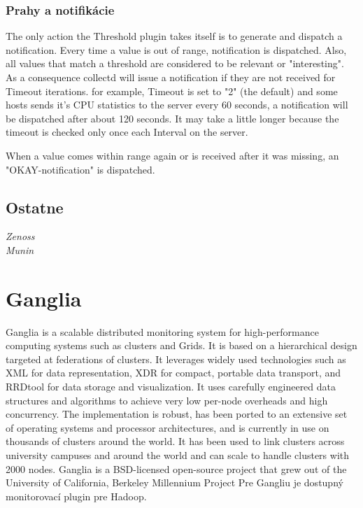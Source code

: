 \documentclass[11pt,final,oneside]{fithesis}
\begin{document}
\subsubsection{Prahy a notifikácie}

The only action the Threshold plugin takes itself is to generate and dispatch a notification. Every time a value is out of range, 
notification is dispatched. 
Also, all values that match a threshold are considered to be relevant or "interesting". As a consequence collectd will issue a notification 
if they are not received for Timeout iterations.  for example, Timeout is set to "2" (the default) and some hosts sends it's CPU statistics to the server every 60 seconds, a notification will be dispatched after about 120 seconds. It may take a little longer because the timeout is checked only once each Interval on the server.

When a value comes within range again or is received after it was missing, an "OKAY-notification" is dispatched.
\cite{14}

\subsection{Ostatne} 
\begin{description}
\item[\emph{Zenoss}]
\item[\emph{Munin}]
\end{description}

\section{Ganglia} 
Ganglia is a scalable distributed monitoring system for high-performance computing systems such as clusters and Grids. It is based on a hierarchical design targeted at federations of clusters. It leverages widely used technologies such as XML for data representation, XDR for compact, portable data transport, and RRDtool for data storage and visualization. It uses carefully engineered data structures and algorithms to achieve very low per-node overheads and high concurrency. The implementation is robust, has been ported to an extensive set of operating systems and processor architectures, and is currently in use on thousands of clusters around the world. It has been used to link clusters across university campuses and around the world and can scale to handle clusters with 2000 nodes.
Ganglia is a BSD-licensed open-source project that grew out of the University of California, Berkeley Millennium Project
\cite{15}
Pre Gangliu je dostupný monitorovací plugin pre Hadoop.
\cite{16}
\end{document}
